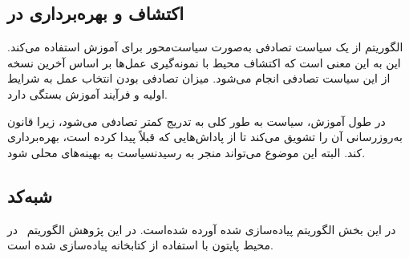    
        \subsection{اکتشاف و بهره‌برداری در 
   }
الگوریتم  از یک سیاست تصادفی به‌صورت سیاست‌محور برای آموزش استفاده می‌کند. این به این معنی است که اکتشاف محیط با نمونه‌گیری عمل‌ها بر اساس آخرین نسخه از این سیاست تصادفی انجام می‌شود. میزان تصادفی بودن انتخاب عمل به شرایط اولیه و فرآیند آموزش بستگی دارد.

در طول آموزش، سیاست به طور کلی به تدریج کمتر تصادفی می‌شود، زیرا قانون به‌روزرسانی آن را تشویق می‌کند تا از پاداش‌هایی که قبلاً پیدا کرده است، بهره‌برداری کند. البته این موضوع می‌تواند منجر به رسیدنسیاست به بهینه‌های محلی
 شود.
 
 
         \subsection{شبه‌کد
         }
 
 در این بخش الگوریتم
 پیاده‌سازی شده آورده شده‌است. در این پژوهش الگوریتم~ در محیط پایتون با استفاده از کتابخانه
   \cite{paszke2017automatic}
  پیاده‌سازی شده ‌است.
 



